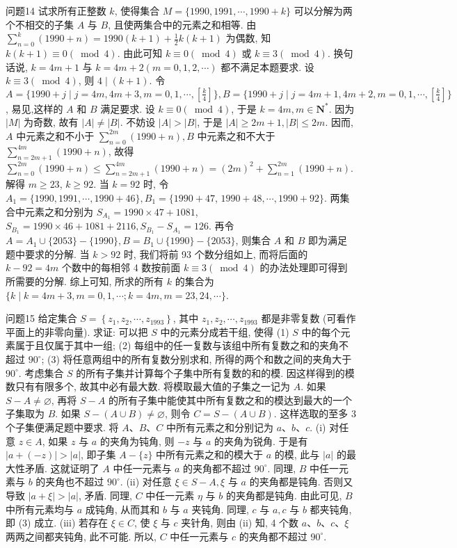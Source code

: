 问题14 试求所有正整数 $k$, 使得集合 $M=\{1990,1991, \cdots, 1990+k\}$ 可以分解为两个不相交的子集 $A$ 与 $B$, 且使两集合中的元素之和相等.
由 $\sum_{n=0}^k(1990+n)=1990(k+1)+\frac{1}{2} k(k+1)$ 为偶数, 知 $k(k+1) \equiv 0(\bmod 4)$. 由此可知 $k \equiv 0(\bmod 4)$ 或 $k \equiv 3(\bmod 4)$. 换句话说, $k=4 m+1$ 与 $k=4 m+2(m=0,1,2, \cdots)$ 都不满足本题要求.
设 $k \equiv 3(\bmod 4)$, 则 $4 \mid(k+1)$. 令 $A=\{1990+j \mid j=4 m, 4 m+3,m=0,1, \cdots,\left[\frac{k}{4}\right]\}, B=\{1990+j \mid j=4 m+1,4 m+2, m=0,1, \cdots,\left[\frac{k}{4}\right] \}$, 易见,这样的 $A$ 和 $B$ 满足要求.
设 $k \equiv 0(\bmod 4)$, 于是 $k=4 m, m \in \mathbf{N}^*$. 因为 $|M|$ 为奇数, 故有 $|A| \neq|B|$. 不妨设 $|A|>|B|$, 于是 $|A| \geqslant 2 m+1,|B| \leqslant 2 m$. 因而, $A$ 中元素之和不小于 $\sum_{n=0}^{2 m}(1990+n), B$ 中元素之和不大于 $\sum_{n=2 m+1}^{4 m}(1990+n)$, 故得 $\sum_{n=0}^{2 m}(1990+n) \leqslant \sum_{n=2 m+1}^{4 m}(1990+n)=(2 m)^2+\sum_{n=1}^{2 m}(1990+n)$. 解得 $m \geqslant 23$, $k \geqslant 92$. 当 $k=92$ 时, 令 $A_1=\{1990,1991, \cdots, 1990+46\}, B_1=\{1990+47$, $1990+48, \cdots, 1990+92\}$. 两集合中元素之和分别为 $S_{A_1}=1990 \times 47+1081$, $S_{B_1}=1990 \times 46+1081+2116, S_{B_1}-S_{A_1}=126$. 再令 $A=A_1 \cup\{2053\}- \{1990\}, B=B_1 \cup\{1990\}-\{2053\}$, 则集合 $A$ 和 $B$ 即为满足题中要求的分解.
当 $k>92$ 时, 我们将前 93 个数分组如上, 而将后面的 $k-92=4 m$ 个数中的每相邻 4 数按前面 $k \equiv 3(\bmod 4)$ 的办法处理即可得到所需要的分解.
综上可知, 所求的所有 $k$ 的集合为 $\{k \mid k=4 m+3, m=0,1, \cdots ; k= 4 m, m=23,24, \cdots\}$.



问题15 给定集合 $S=\left\{z_1, z_2, \cdots, z_{1993}\right\}$, 其中 $z_1, z_2, \cdots, z_{1993}$ 都是非零复数 (可看作平面上的非零向量). 求证: 可以把 $S$ 中的元素分成若干组, 使得
(1) $S$ 中的每个元素属于且仅属于其中一组;
(2) 每组中的任一复数与该组中所有复数之和的夹角不超过 $90^{\circ}$;
(3) 将任意两组中的所有复数分别求和, 所得的两个和数之间的夹角大于 $90^{\circ}$.
考虑集合 $S$ 的所有子集并计算每个子集中所有复数的和的模.
因这样得到的模数只有有限多个, 故其中必有最大数.
将模取最大值的子集之一记为 $A$. 如果 $S-A \neq \varnothing$, 再将 $S-A$ 的所有子集中能使其中所有复数之和的模达到最大的一个子集取为 $B$. 如果 $S-(A \cup B) \neq \varnothing$, 则令 $C=S-(A \cup B)$. 这样选取的至多 3 个子集便满足题中要求.
将 $A 、 B 、 C$ 中所有元素之和分别记为 $a 、 b 、 c$.
(i) 对任意 $z \in A$, 如果 $z$ 与 $a$ 的夹角为钝角, 则 $-z$ 与 $a$ 的夹角为锐角.
于是有 $|a+(-z)|>|a|$, 即子集 $A-\{z\}$ 中所有元素之和的模大于 $a$ 的模, 此与 $|a|$ 的最大性矛盾.
这就证明了 $A$ 中任一元素与 $a$ 的夹角都不超过 $90^{\circ}$. 同理, $B$ 中任一元素与 $b$ 的夹角也不超过 $90^{\circ}$.
(ii) 对任意 $\xi \in S-A, \xi$ 与 $a$ 的夹角都是钝角.
否则又导致 $|a+\xi|>|a|$, 矛盾.
同理, $C$ 中任一元素 $\eta$ 与 $b$ 的夹角都是钝角.
由此可见, $B$ 中所有元素均与 $a$ 成钝角, 从而其和 $b$ 与 $a$ 夹钝角.
同理, $c$ 与 $a, c$ 与 $b$ 都夹钝角, 即 (3) 成立.
(iii) 若存在 $\xi \in C$, 使 $\xi$ 与 $c$ 夹针角, 则由 (ii) 知, 4 个数 $a 、 b 、 c 、 \xi$ 两两之间都夹钝角, 此不可能.
所以, $C$ 中任一元素与 $c$ 的夹角都不超过 $90^{\circ}$.



